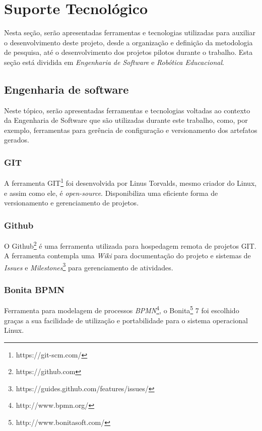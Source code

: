 
\chapter[Suporte Tecnológico]{Suporte Tecnológico}

Nesta seção, serão apresentadas ferramentas e tecnologias utilizadas para auxiliar o desenvolvimento deste projeto, desde a organização e definição da metodologia de pesquisa, até o desenvolvimento dos projetos pilotos durante o trabalho. Esta seção está dividida em \textit{Engenharia de Software} e \textit{Robótica Educacional}.

\section{Engenharia de software} %
\label{sec:engenharia_de_software}
	Neste tópico, serão apresentadas ferramentas e tecnologias voltadas ao contexto da Engenharia de Software que são utilizadas durante este trabalho, como, por exemplo, ferramentas para gerência de configuração e versionamento dos artefatos gerados.

	\subsection{GIT} %
	\label{sub:git}
	
		A ferramenta GIT\footnote{https://git-scm.com/} foi desenvolvida por Linus Torvalds, mesmo criador do Linux, e assim como ele, é \textit{open-source}. Disponibiliza uma eficiente forma de versionamento e gerenciamento de projetos. 

	\subsection{Github} %
	\label{sub:github}
		O Github\footnote{https://github.com} é uma ferramenta utilizada para hospedagem remota de projetos GIT. A ferramenta contempla uma \textit{Wiki} para documentação do projeto e sistemas de \textit{Issues} e \textit{Milestones}\footnote{https://guides.github.com/features/issues/} para gerenciamento de atividades.

	\subsection{Bonita BPMN} %
	\label{sub:bonita_bpmn}
		Ferramenta para modelagem de processos \textit{BPMN}\footnote{http://www.bpmn.org/}, o Bonita\footnote{http://www.bonitasoft.com/} 7 foi escolhido graças a sua facilidade de utilização e portabilidade para o sistema operacional Linux.

